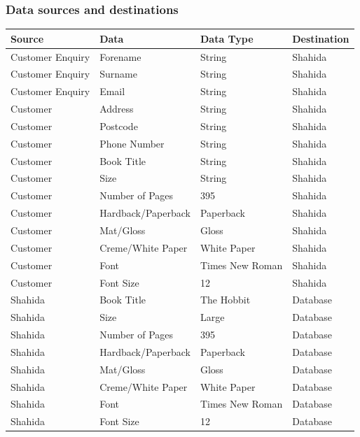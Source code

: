 \subsubsection{Data sources and destinations}
\begin{center}
\begin{tabular}{|p{3cm}|p{3.5cm}|p{3cm}|p{2.5cm}|}
    \hline
    \textbf{Source} & \textbf{Data} & \textbf{Data Type} & \textbf{Destination} \\ \hline
    Customer Enquiry & Forename & String & Shahida  \\ \hline
    Customer Enquiry & Surname & String & Shahida  \\ \hline
    Customer Enquiry & Email & String & Shahida  \\ \hline
    Customer & Address & String & Shahida  \\ \hline
    Customer & Postcode & String & Shahida  \\ \hline
    Customer & Phone Number & String & Shahida  \\ \hline
    Customer & Book Title & String & Shahida \\  \hline
    Customer & Size & String & Shahida \\  \hline
    Customer & Number of Pages & 395 & Shahida \\  \hline
    Customer & Hardback/Paperback & Paperback & Shahida \\  \hline
    Customer & Mat/Gloss & Gloss & Shahida \\  \hline
    Customer & Creme/White Paper & White Paper & Shahida \\  \hline
    Customer & Font & Times New Roman & Shahida \\  \hline
    Customer & Font Size & 12 & Shahida \\  \hline
    Shahida & Book Title & The Hobbit & Database \\  \hline
    Shahida & Size & Large & Database \\  \hline
    Shahida & Number of Pages & 395 & Database \\  \hline
    Shahida & Hardback/Paperback & Paperback & Database \\  \hline
    Shahida & Mat/Gloss & Gloss & Database \\  \hline
    Shahida & Creme/White Paper & White Paper & Database \\  \hline
    Shahida & Font & Times New Roman & Database \\  \hline
    Shahida & Font Size & 12 & Database \\  \hline

\end{tabular}
\end{center}
